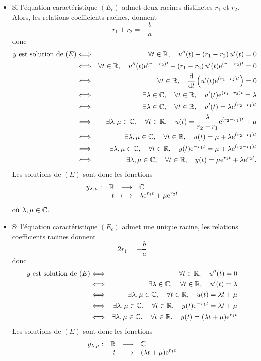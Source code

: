 \documentclass{magnoliaold}
\begin{document}
\begin{preuve}
\begin{francois}
\begin{itemize}
\item Si l'équation caractéristique $(E_c)$ admet deux racines distinctes $r_1$ et $r_2$. Alors, les relations coefficients racines, donnent
\[r_1+r_2=-\frac{b}{a}\]
donc
\begin{eqnarray*}
\text{$y$ est solution de $(E)$}
&\Longleftrightarrow& \forall t\in \mathbb{R},\quad u''(t)+\left(r_1-r_2\right)u'(t)=0\\
&\Longleftrightarrow& \forall t\in \mathbb{R},\quad u''(t){\rm e}^{(r_1-r_2)t}+\left(r_1-r_2\right)u'(t){\rm e}^{(r_1-r_2)t}=0\\
&\Longleftrightarrow& \forall t\in\mathbb{R},\quad \frac{{\rm d}}{{\rm d}t}\left(u'(t){\rm e}^{(r_1-r_2)t}\right)=0\\
&\Longleftrightarrow& \exists\lambda\in\mathbb{C},\quad \forall t\in\mathbb{R},\quad u'(t){\rm e}^{(r_1-r_2)t}=\lambda\\
&\Longleftrightarrow& \exists\lambda\in\mathbb{C},\quad \forall t\in\mathbb{R},\quad u'(t)=\lambda {\rm e}^{(r_2-r_1)t}\\
&\Longleftrightarrow& \exists\lambda,\mu\in\mathbb{C},\quad \forall t\in\mathbb{R},\quad u(t)=\frac{\lambda}{r_2-r_1} {\rm e}^{(r_2-r_1)t}+\mu\\
&\Longleftrightarrow& \exists\lambda,\mu\in\mathbb{C},\quad \forall t\in\mathbb{R},\quad u(t)=\mu+\lambda {\rm e}^{(r_2-r_1)t}\\
&\Longleftrightarrow& \exists\lambda,\mu\in\mathbb{C},\quad \forall t\in\mathbb{R},\quad y(t){\rm e}^{-r_1 t}=\mu+\lambda {\rm e}^{(r_2-r_1)t}\\
&\Longleftrightarrow& \exists\lambda,\mu\in\mathbb{C},\quad \forall t\in\mathbb{R},\quad y(t)=\mu {\rm e}^{r_1 t}+\lambda {\rm e}^{r_2 t }.
\end{eqnarray*}
Les solutions de $(E)$ sont donc les fonctions
\[\begin{array}[t]{lrcl} \displaystyle{y_{\lambda,\mu}} : & \displaystyle{\mathbb{R}} & \longrightarrow & \displaystyle{\mathbb{C}} \\ & \displaystyle{t} & \longmapsto & \displaystyle{\lambda {\rm e}^{r_1 t}+\mu {\rm e}^{r_2 t}} \end{array}\]
où $\lambda,\mu\in\mathbb{C}$.
\item Si l'équation caractéristique $(E_c)$ admet une unique racine, les relations coefficients racines donnent
\[2r_1=-\frac{b}{a}\]
donc
\begin{eqnarray*}
\text{$y$ est solution de $(E)$}
&\Longleftrightarrow& \forall t\in \mathbb{R},\quad u''(t)=0\\
&\Longleftrightarrow& \exists\lambda\in\mathbb{C},\quad \forall t\in \mathbb{R},\quad u'(t)=\lambda\\
&\Longleftrightarrow& \exists\lambda,\mu\in\mathbb{C},\quad \forall t\in \mathbb{R},\quad u(t)=\lambda t+\mu\\
&\Longleftrightarrow& \exists\lambda,\mu\in\mathbb{C},\quad \forall t\in\mathbb{R},\quad y(t){\rm e}^{-r_1 t}=\lambda t+\mu\\
&\Longleftrightarrow& \exists\lambda,\mu\in\mathbb{C},\quad \forall t\in\mathbb{R},\quad y(t)=(\lambda t+\mu) {\rm e}^{r_1 t}
\end{eqnarray*}
Les solutions de $(E)$ sont donc les fonctions
\[\begin{array}[t]{lrcl} \displaystyle{y_{\lambda,\mu}} : & \displaystyle{\mathbb{R}} & \longrightarrow & \displaystyle{\mathbb{C}} \\ & \displaystyle{t} & \longmapsto & \displaystyle{(\lambda t+\mu){\rm e}^{r_1 t}} \end{array}\]

\end{itemize}
\end{francois}
\end{preuve}
\end{document}
